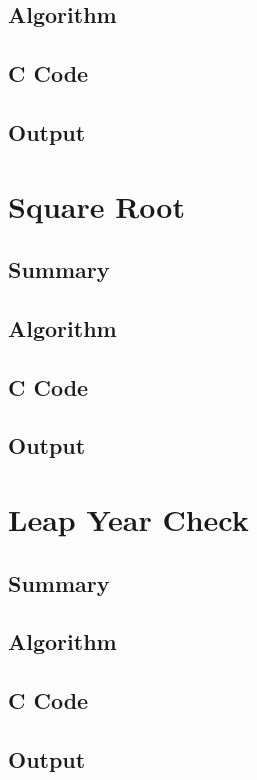 \documentclass[a4paper]{report}
\begin{document}
\section*{Algorithm}
\section*{C Code}
\section*{Output}

\chapter{Square Root}
\section*{Summary}
\section*{Algorithm}
\section*{C Code}
\section*{Output}

\chapter{Leap Year Check}
\section*{Summary}
\section*{Algorithm}
\section*{C Code}
\section*{Output}
\end{document}
